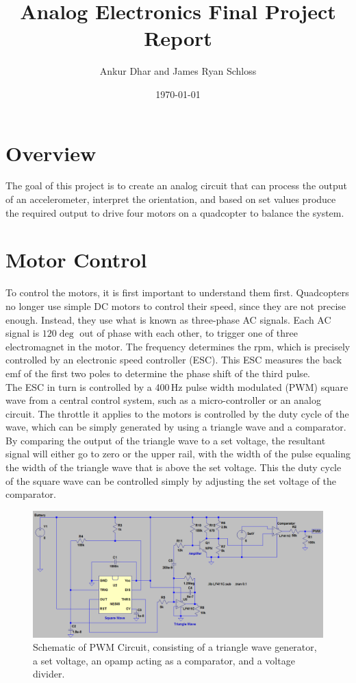 \documentclass[11pt]{article} %
\title{Analog Electronics Final Project Report}
\author{Ankur Dhar and James Ryan Schloss}
\date{\today} %
\begin{document}
\maketitle
\section{Overview}
The goal of this project is to create an analog circuit that can process the output of an accelerometer, interpret the orientation, and based on set values produce the required output to drive four motors on a quadcopter to balance the system.



\section{Motor Control}
To control the motors, it is first important to understand them first. Quadcopters no longer use simple DC motors to control their speed, since they are not precise enough. Instead, they use what is known as three-phase AC signals. Each AC signal is $120\deg$ out of phase with each other, to trigger one of three electromagnet in the motor. The frequency determines the rpm, which is precisely controlled by an electronic speed controller (ESC). This ESC measures the back emf of the first two poles to determine the phase shift of the third pulse.\\
The ESC in turn is controlled by a 400\,Hz pulse width modulated (PWM) square wave from a central control system, such as a micro-controller or an analog circuit. The throttle it applies to the motors is controlled by the duty cycle of the wave, which can be simply generated by using a triangle wave and a comparator.\\
By comparing the output of the triangle wave to a set voltage, the resultant signal will either go to zero or the upper rail, with the width of the pulse equaling the width of the triangle wave that is above the set voltage. This the duty cycle of the square wave can be controlled simply by adjusting the set voltage of the comparator.\\
\begin{figure}[h]
	\centering
	\includegraphics[width=\textwidth]{MotorControl}
	\caption{Schematic of PWM Circuit, consisting of a triangle wave generator, a set voltage, an opamp acting as a comparator, and a voltage divider.}
	\label{fig:PWM}
\end{figure}
\end{document}
